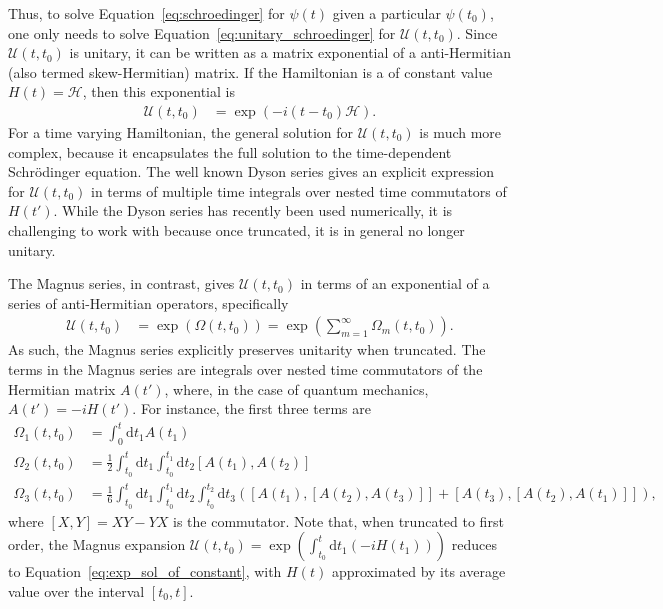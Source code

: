 \documentclass{jors}
\newcommand{\note}[1]{\textcolor{green}{\texttt{[NOTE: #1]}}}
\begin{document}
		Thus, to solve Equation~\eqref{eq:schroedinger} for $ \psi(t) $ given a particular $ \psi(t_0) $, one only needs to solve Equation~\eqref{eq:unitary_schroedinger} for $ \mathcal{U}(t, t_0) $.
		Since $ \mathcal{U}(t, t_0) $ is unitary, it can be written as a matrix exponential of a anti-Hermitian (also termed skew-Hermitian) matrix.
		If the Hamiltonian is a of constant value $ H(t) = \mathcal{H} $, then this exponential is %
		\begin{align}
			\mathcal{U}(t, t_0) &= \exp(-i (t - t_0) \mathcal{H}).\label{eq:exp_sol_of_constant}
		\end{align}
		For a time varying Hamiltonian, the general solution for $ \mathcal{U}(t, t_0) $ is much more complex, because it encapsulates the full solution to the time-dependent Schr\"{o}dinger equation.
		The well known Dyson series\cite{kalev_integral-free_2020} gives an explicit expression for $ \mathcal{U}(t, t_0) $ in terms of multiple time integrals over nested time commutators of $ H(t') $.
		While the Dyson series has recently been used numerically\cite{kalev_integral-free_2020}, it is challenging to work with because once truncated, it is in general no longer unitary.

		The Magnus series, in contrast, gives $ \mathcal{U}(t, t_0) $ in terms of an exponential of a series of anti-Hermitian operators, specifically
		\begin{align}
			\mathcal{U}(t, t_0) &= \exp\left(\Omega(t, t_0)\right) = \exp\left(\sum_{m = 1}^\infty \Omega_m(t, t_0)\right).
		\end{align}
		As such, the Magnus series explicitly preserves unitarity when truncated\cite{magnus_exponential_1954}.
		The terms in the Magnus series are integrals over nested time commutators of the Hermitian matrix $ A(t') $, where, in the case of quantum mechanics, $ A(t') = -iH(t') $.
		For instance, the first three terms are\cite{blanes_magnus_2009}
		\begin{align}
			\Omega_1(t, t_0) &= \int_0^t\mathrm{d}t_1A(t_1)\\
			\Omega_2(t, t_0) &= \frac12\int_{t_0}^t\mathrm{d}t_1\int_{t_0}^{t_1}\mathrm{d}t_2[A(t_1), A(t_2)]\\
			\Omega_3(t, t_0) &= \frac16\int_{t_0}^t\mathrm{d}t_1\int_{t_0}^{t_1}\mathrm{d}t_2\int_{t_0}^{t_2}\mathrm{d}t_3\left([A(t_1), [A(t_2), A(t_3)]] + [A(t_3), [A(t_2), A(t_1)]]\right),
		\end{align}
		where $ [X, Y] = XY - YX $ is the commutator.
		Note that, when truncated to first order, the Magnus expansion $ \mathcal{U}(t, t_0) = \exp\left(\int_{t_0}^t\mathrm{d}t_1\left(-iH(t_1)\right)\right) $ reduces to Equation~\eqref{eq:exp_sol_of_constant}, with $ H(t) $ approximated by its average value over the interval $ [t_0, t] $.
\end{document}
